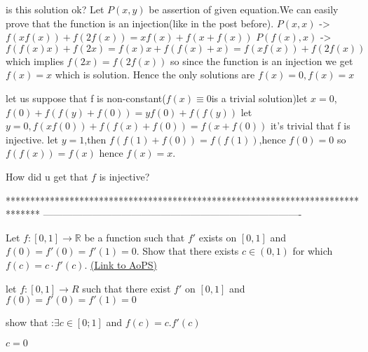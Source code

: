 \begin{solution}
	is this solution ok?
Let $P(x,y)$ be assertion of given equation.We can easily prove that the function is an injection(like in the post before).
$P(x,x)$ ->$f(xf(x))+f(2f(x))=xf(x)+f(x+f(x))$
$P(f(x),x)$ ->$f(f(x)x)+f(2x)=f(x)x+f(f(x)+x)=f(xf(x))+f(2f(x))$ which implies $f(2x)=f(2f(x))$ so since the function is an injection we get $f(x)=x$ which is solution.
Hence the only solutions are $f(x)=0,f(x)=x$
\end{solution}



\begin{solution}
	\begin{tcolorbox}let us suppose that f is non-constant($f(x)\equiv 0 $is a trivial solution)let $x=0$,$f(0)+f(f(y)+f(0))=yf(0)+f(f(y))$
let $y=0,f(xf(0))+f(f(x)+f(0))=f(x+f(0))$
it's trivial that f is injective.
let $y=1$,then $f(f(1)+f(0))=f(f(1))$,hence $f(0)=0$
so $f(f(x))=f(x)$ hence $f(x)=x$.\end{tcolorbox}

How did u get that $f$ is injective?
\end{solution}
*******************************************************************************
-------------------------------------------------------------------------------

\begin{problem}
	Let $ f: [0,1] \to \mathbb R$ be a function such that $ f'$ exists on $ [0,1]$ and $ f(0) = f'(0) = f'(1) = 0$. Show that there exists $ c \in (0,1)$ for which $ f(c) = c\cdot f'(c)$.
	\flushright \href{https://artofproblemsolving.com/community/c6h303639}{(Link to AoPS)}
\end{problem}



\begin{solution}
	\begin{tcolorbox}let $ f: [0,1] \to R$ such that there exist  $ f'$ on $ [0,1]$ and $ f(0) = f'(0) = f'(1) = 0$

show that :$ \exists c \in [0;1]$ and $ f(c) = c.f'(c)$\end{tcolorbox}

$ c=0$
\end{solution}



